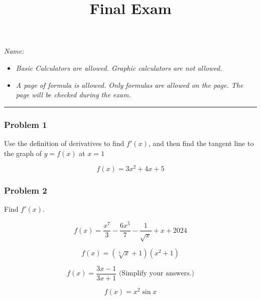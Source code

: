 \documentclass[
  letterpaper,
  DIV=11,
  numbers=noendperiod]{scrartcl}
\title{Final Exam}
\author{}
\date{}
\providecommand{\tightlist}{%
  \setlength{\itemsep}{0pt}\setlength{\parskip}{0pt}}\usepackage{longtable,booktabs,array}
\begin{document}
\maketitle

\thispagestyle{empty}

\emph{Name:}

\begin{itemize}
\tightlist
\item
  \emph{Basic Calculators are allowed. Graphic calculators are not
  allowed.}
\item
  \emph{A page of formula is allowed. Only formulas are allowed on the
  page. The page will be checked during the exam.}
\end{itemize}

\begin{center}\rule{0.5\linewidth}{0.5pt}\end{center}

\subsubsection{Problem 1}\label{problem-1}

Use the definition of derivatives to find \(f'(x)\), and then find the
tangent line to the graph of \(y = f(x)\) at \(x = 1\)

\[
f(x) = 3x^2  + 4x + 5
\]

\newpage{}

\subsubsection{Problem 2}\label{problem-2}

Find \(f'(x)\).

\[f(x) =  \frac{x^7}{3} - \frac{6x^5}{7} - \frac{1}{\sqrt{x}} + x + 2024\]

\hfill\break
\hfill\break
\hfill\break
\hfill\break

\[f(x) = (\sqrt[3]{x}+1)(x^2+1)\]

\hfill\break
\hfill\break
\hfill\break
\hfill\break
\hfill\break

\[f(x) = \frac{3x-1}{3x+1} \text{   (Simplify your answers.)}\]

\hfill\break
\hfill\break
\hfill\break
\hfill\break
\hfill\break

\thispagestyle{empty}

\[f(x) = x^2\sin x\]

\hfill\break
\hfill\break
\hfill\break
\hfill\break
\hfill\break
\end{document}
